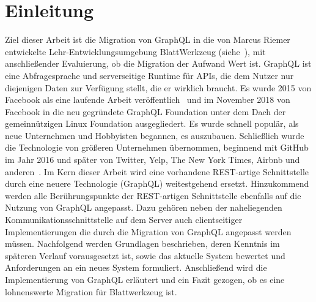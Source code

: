 
\chapter{Einleitung}
\label{sec:introduction}

Ziel dieser Arbeit ist die Migration von GraphQL in die von Marcus Riemer entwickelte Lehr-Entwicklungsumgebung BlattWerkzeug (siehe~), mit anschließender Evaluierung, ob die Migration der Aufwand Wert ist.
GraphQL ist eine Abfragesprache und serverseitige Runtime für APIs, die dem Nutzer nur diejenigen Daten zur Verfügung stellt, die er wirklich braucht. Es wurde 2015 von Facebook als eine laufende Arbeit veröffentlich~\cite{graphql-first-commit} und im November 2018 von Facebook in die neu gegründete GraphQL Foundation unter dem Dach der gemeinnützigen Linux Foundation ausgegliedert. Es wurde schnell populär, als neue Unternehmen und Hobbyisten begannen, es auszubauen. Schließlich wurde die Technologie von größeren Unternehmen übernommen, beginnend mit GitHub im Jahr 2016 und später von Twitter, Yelp, The New York Times, Airbnb und anderen~\cite{graphql-users}.
Im Kern dieser Arbeit wird eine vorhandene REST-artige Schnittstelle durch eine neuere Technologie (GraphQL) weitestgehend ersetzt. Hinzukommend werden alle Berührungspunkte der REST-artigen Schnittstelle ebenfalls auf die Nutzung von GraphQL angepasst. Dazu gehören neben der naheliegenden Kommunikationsschnittstelle auf dem Server auch clientseitiger Implementierungen die durch die Migration von GraphQL angepasst werden müssen. 
Nachfolgend werden Grundlagen beschrieben, deren Kenntnis im späteren Verlauf vorausgesetzt ist, sowie das aktuelle System bewertet und Anforderungen an ein neues System formuliert. Anschließend wird die Implementierung von GraphQL
erläutert und ein Fazit gezogen, ob es eine lohnenswerte Migration für Blattwerkzeug ist.
 


